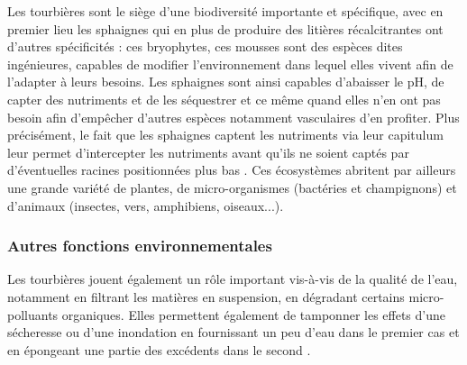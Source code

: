 Les tourbières sont le siège d'une biodiversité importante et spécifique, avec en premier lieu les sphaignes qui en plus de produire des litières récalcitrantes ont d'autres spécificités : 
ces bryophytes, ces mousses sont des espèces dites ingénieures, capables de modifier l'environnement dans lequel elles vivent afin de l'adapter à leurs besoins.
Les sphaignes sont ainsi capables d'abaisser le pH, de capter des nutriments et de les séquestrer et ce même quand elles n'en ont pas besoin afin d'empêcher d'autres espèces notamment vasculaires d'en profiter.
Plus précisément, le fait que les sphaignes captent les nutriments via leur capitulum leur permet d'intercepter les nutriments avant qu'ils ne soient captés par d'éventuelles racines positionnées plus bas \citep{malmer1994,svensson1995}.
Ces écosystèmes abritent par ailleurs une grande variété de plantes, de micro-organismes (bactéries et champignons) et d'animaux (insectes, vers, amphibiens, oiseaux...).

\subsubsection{Autres fonctions environnementales}

Les tourbières jouent également un rôle important vis-à-vis de la qualité de l'eau, notamment en filtrant les matières en suspension, en dégradant certains micro-polluants organiques.
Elles permettent également de tamponner les effets d'une sécheresse ou d'une inondation en fournissant un peu d'eau dans le premier cas et en épongeant une partie des excédents dans le second \citep{joosten2002,parish2008}.

